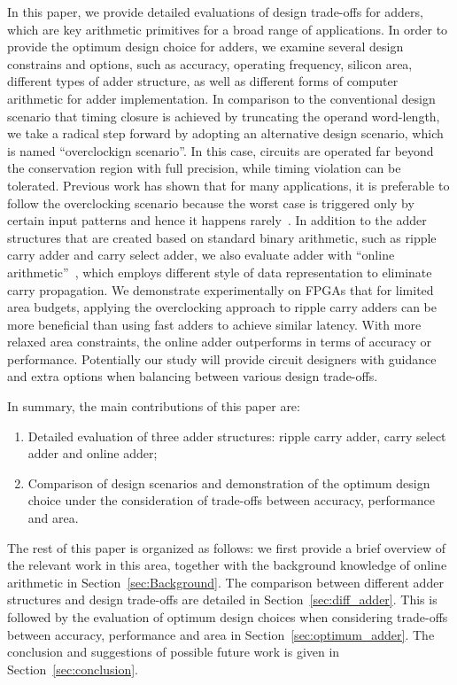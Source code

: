 \documentclass[10pt, conference, compsocconf]{IEEEtran}
\begin{document}
In this paper, we provide detailed evaluations of design trade-offs for adders, which are key arithmetic primitives for a broad range of applications. In order to provide the optimum design choice for adders, we examine several design constrains and options, such as accuracy, operating frequency, silicon area, different types of adder structure, as well as different forms of computer arithmetic for adder implementation. In comparison to the conventional design scenario that timing closure is achieved by truncating the operand word-length, we take a radical step forward by adopting an alternative design scenario, which is named ``overclockign scenario''. In this case, circuits are operated far beyond the conservation region with full precision, while timing violation can be tolerated. Previous work has shown that for many applications, it is preferable to follow the overclocking scenario because the worst case is triggered only by certain input patterns and hence it happens rarely~\cite{SKfccm13}. In addition to the adder structures that are created based on standard binary arithmetic, such as ripple carry adder and carry select adder, we also evaluate adder with ``online arithmetic''~\cite{Ercegovac_OnlineOverview}, which employs different style of data representation to eliminate carry propagation. We demonstrate experimentally on FPGAs that for limited area budgets, applying the overclocking approach to ripple carry adders can be more beneficial than using fast adders to achieve similar latency. With more relaxed area constraints, the online adder outperforms in terms of accuracy or performance. Potentially our study will provide circuit designers with guidance and extra options when balancing between various design trade-offs.

In summary, the main contributions of this paper are:
\begin{enumerate}
  \item Detailed evaluation of three adder structures: ripple carry adder, carry select adder and online adder; 
  \item Comparison of design scenarios and demonstration of the optimum design choice under the consideration of trade-offs between accuracy, performance and area.
\end{enumerate}

The rest of this paper is organized as follows: we first provide a brief overview of the relevant work in this area, together with the background knowledge of online arithmetic in Section~\ref{sec:Background}. The comparison between different adder structures and design trade-offs are detailed in Section~\ref{sec:diff_adder}. This is followed by the evaluation of optimum design choices when considering trade-offs between accuracy, performance and area in Section~\ref{sec:optimum_adder}. The conclusion and suggestions of possible future work is given in Section~\ref{sec:conclusion}.
\end{document}
